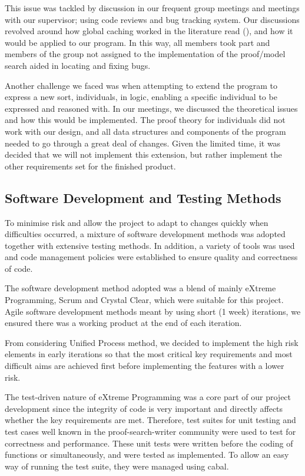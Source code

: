 This issue was tackled by discussion in our frequent group meetings and meetings with our supervisor; using code reviews and bug tracking system. Our discussions revolved around how global caching worked in the literature read (\cite{gore07, Gore:2010:OTA}), and how it would be applied to our program. In this way, all members took part and members of the group not assigned to the implementation of the proof/model search aided in locating and fixing bugs.

Another challenge we faced was when attempting to extend the program to express a new sort, individuals, in logic, enabling a specific individual to be expressed and reasoned with. In our meetings, we discussed the theoretical issues and how this would be implemented. The proof theory for individuals did not work with our design, and all data structures and components of the program needed to go through a great deal of changes. Given the limited time, it was decided that we will not implement this extension, but rather implement the other requirements set for the finished product.

\subsection{Software Development and Testing Methods}

To minimise risk and allow the project to adapt to changes quickly when difficulties occurred, a mixture of software development methods was adopted together with extensive testing methods. In addition, a variety of tools was used and code management policies were established to ensure quality and correctness of code.


The software development method adopted was a blend of mainly eXtreme Programming, Scrum and Crystal Clear, which were suitable for this project. Agile software development methods meant by using short (1 week) iterations, we ensured there was a working product at the end of each iteration.

From considering Unified Process method, we decided to implement the high risk elements in early iterations so that the most critical key requirements and most difficult aims are achieved first before implementing the features with a lower risk.

The test-driven nature of eXtreme Programming was a core part of our project development since the integrity of code is very important and directly affects whether the key requirements are met. Therefore, test suites for unit testing and test cases well known in the proof-search-writer community were used to test for correctness and performance. These unit tests were written before the coding of functions or simultaneously, and were tested as implemented. To allow an easy way of running the test suite, they were managed using cabal.

